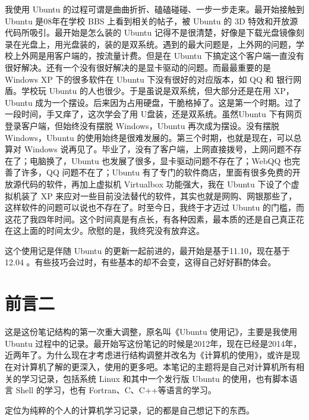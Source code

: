 \documentclass[a4paper,11pt,twoside]{book}
\begin{document}
    我使用 Ubuntu 的过程可谓是曲曲折折、磕磕碰碰、一步一步走来。最开始接触到 Ubuntu 是08年在学校 BBS 上看到相关的帖子，被 Ubuntu 的 3D 特效和开放源代码所吸引。最开始是怎么装的 Ubuntu 记得不是很清楚，好像是下载光盘镜像刻录在光盘上，用光盘装的，装的是双系统。遇到的最大问题是，上外网的问题，学校上外网是用客户端的，按流量计费。但是在 Ubuntu 下搞定这个客户端一直没有很好解决。还有一个没有很好解决的是显卡驱动的问题。而最最重要的是 Windows  XP 下的很多软件在 Ubuntu 下没有很好的对应版本，如 QQ 和 银行网盾。学校玩 Ubuntu 的人也很少。于是虽说是双系统，但大部分还是在用 XP， Ubuntu 成为一个摆设。后来因为占用硬盘，干脆格掉了。这是第一个时期。过了一段时间，手又痒了，这次学会了用 U盘装，还是双系统。虽然Ubuntu 下有网页登录客户端，但始终没有摆脱 Windows，Ubuntu 再次成为摆设。没有摆脱Windows，Ubuntu 的使用始终是很难发展的。第三个时期，也就是现在，可以总算对 Windows 说再见了。毕业了，没有了客户端，上网直接拨号，上网问题不存在了；电脑换了，Ubuntu 也发展了很多，显卡驱动问题不存在了；WebQQ 也完善了许多，QQ 问题不在了；Ubuntu 有了专门的软件商店，里面有很多免费的开放源代码的软件，再加上虚拟机 Virtualbox 功能强大，我在 Ubuntu 下设了个虚拟机装了 XP 来应对一些目前没法替代的软件，其实也就是网购、网银那些了，这样软件的问题可以说也不存在了。时至今日，我终于才迈过 Ubuntu 的门槛，而这花了我四年时间。这个时间真是有点长，有各种因素，最本质的还是自己真正花在这上面的时间太少。欣慰的是，我终究没有放弃这。
    
 这个使用记是伴随 Ubuntu 的更新一起前进的，最开始是基于11.10，现在基于12.04 。有些技巧会过时，有些基本的却不会变，这得自己好好斟酌体会。
 



\section*{前言二}
这是这份笔记结构的第一次重大调整，原名叫《Ubuntu 使用记》，主要是我使用 Ubuntu 过程中的记录。最开始写这份笔记的时候是2012年，现在已经是2014年，近两年了。为什么现在才考虑进行结构调整并改名为《计算机的使用》，或许是现在对计算机了解的更深入，使用的更多吧。本笔记的主题将是自己对计算机所有相关的学习记录，包括系统 Linux 和其中一个发行版 Ubuntu 的使用，也有脚本语言 Shell 的学习，也有 Fortran、C、C++等语言的学习。


定位为纯粹的个人的计算机学习记录，记的都是自己想记下的东西。

\end{document}
